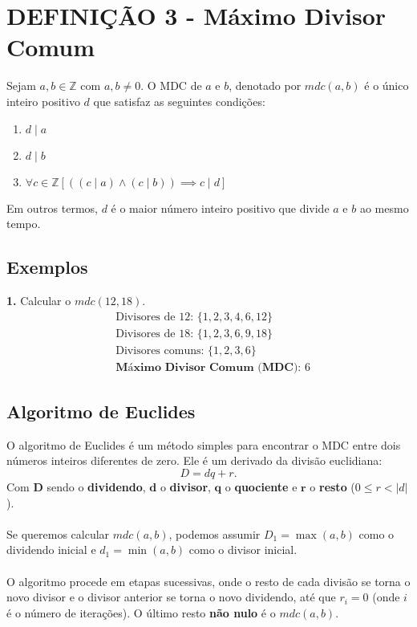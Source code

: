 \section{DEFINIÇÃO 3 - Máximo Divisor Comum}
Sejam $a, b \in \mathbb{Z}$ com $a, b \neq 0$. O MDC de $a$ e $b$, denotado por $mdc(a, b)$ é o único inteiro positivo $d$ que satisfaz as seguintes condições:
\begin{enumerate}
    \item $d \mid a$
    \item $d \mid b$
    \item $\forall c \in \mathbb{Z} [((c \mid a) \land (c \mid b)) \implies c \mid d]$
\end{enumerate}

Em outros termos, $d$ é o maior número inteiro positivo que divide $a$ e $b$ ao mesmo tempo.

\subsection*{Exemplos}

\textbf{1.} Calcular o $mdc(12, 18)$.
\begin{align*}
     & \text{Divisores de 12: } \{1,2,3,4,6,12\} \\
     & \text{Divisores de 18: } \{1,2,3,6,9,18\} \\
     & \text{Divisores comuns: } \{1,2,3,6\}     \\
     & \textbf{Máximo Divisor Comum (MDC): } 6
\end{align*}
\vspace{-10pt}

\subsection{Algoritmo de Euclides}
O algoritmo de Euclides é um método simples para encontrar o MDC entre dois números inteiros diferentes de zero. Ele é um derivado da divisão euclidiana:
\[
    D = dq + r\text{.}
\]
Com $\mathbf{D}$ sendo o \textbf{dividendo}, $\mathbf{d}$ o \textbf{divisor}, $\mathbf{q}$ o \textbf{quociente} e $\mathbf{r}$ o \textbf{resto} ($0 \leq r < |d|$).\\\\
Se queremos calcular $mdc(a,b)$, podemos assumir $D_1 = \max(a,b)$ como o dividendo inicial e $d_1 = \min(a,b)$ como o divisor inicial.\\\\
O algoritmo procede em etapas sucessivas, onde o resto de cada divisão se torna o novo divisor e o divisor anterior se torna o novo dividendo, até que $r_i = 0$ (onde $i$ é o número de iterações). O último resto \textbf{não nulo} é o $mdc(a,b)$.

